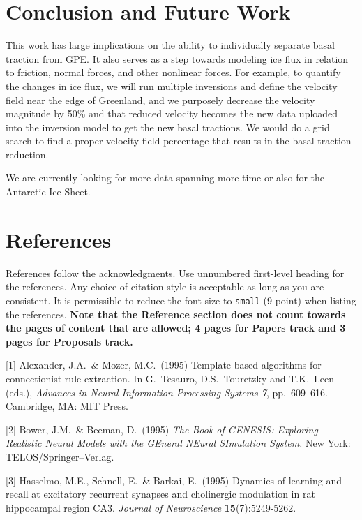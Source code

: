 \documentclass{article}
\begin{document}
\section{Conclusion and Future Work}

This work has large implications on the ability to individually separate basal traction from GPE. It also serves as a step towards modeling ice flux in relation to friction, normal forces, and other nonlinear forces. For example, to quantify the changes in ice flux, we will run multiple inversions and define the velocity field near the edge of Greenland, and we purposely decrease the velocity magnitude by 50\% and that reduced velocity becomes the new data uploaded into the inversion model to get the new basal tractions. We would do a grid search to find a proper velocity field percentage that results in the basal traction reduction.

We are currently looking for more data spanning more time or also for the Antarctic Ice Sheet.


\section*{References}

References follow the acknowledgments. Use unnumbered first-level heading for
the references. Any choice of citation style is acceptable as long as you are
consistent. It is permissible to reduce the font size to \verb+small+ (9 point)
when listing the references.
{\bf Note that the Reference section does not count towards the pages of content that are allowed; 4 pages for Papers track and 3 pages for Proposals track.}
\medskip

\small

[1] Alexander, J.A.\ \& Mozer, M.C.\ (1995) Template-based algorithms for
connectionist rule extraction. In G.\ Tesauro, D.S.\ Touretzky and T.K.\ Leen
(eds.), {\it Advances in Neural Information Processing Systems 7},
pp.\ 609--616. Cambridge, MA: MIT Press.

[2] Bower, J.M.\ \& Beeman, D.\ (1995) {\it The Book of GENESIS: Exploring
  Realistic Neural Models with the GEneral NEural SImulation System.}  New York:
TELOS/Springer--Verlag.

[3] Hasselmo, M.E., Schnell, E.\ \& Barkai, E.\ (1995) Dynamics of learning and
recall at excitatory recurrent synapses and cholinergic modulation in rat
hippocampal region CA3. {\it Journal of Neuroscience} {\bf 15}(7):5249-5262.
\end{document}

